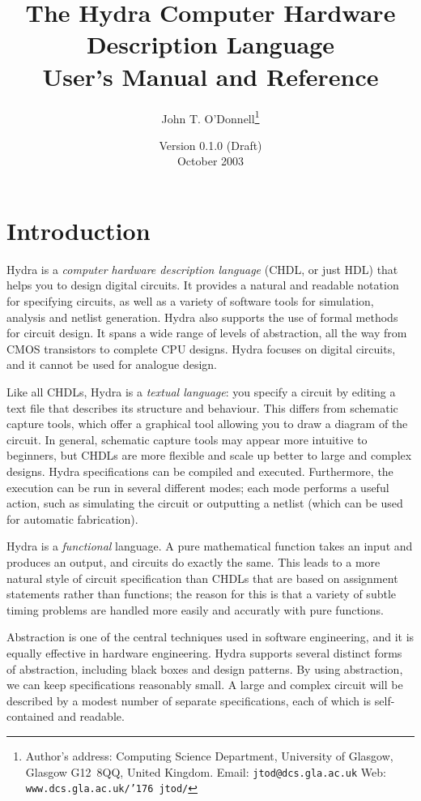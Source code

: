 \documentclass[a4paper,openany,fleqn]{book}
\title{The Hydra Computer Hardware Description Language\\
  User's Manual and Reference}
\author{John T. O'Donnell\footnote{%
  Author's address: Computing Science Department, University of
  Glasgow, Glasgow G12~8QQ, United Kingdom.
  Email: \texttt{jtod@dcs.gla.ac.uk}
  Web: \texttt{www.dcs.gla.ac.uk/\char'176 jtod/}}}
\date{Version 0.1.0 (Draft)\\ October 2003}
\begin{document}
\frontmatter
\maketitle
\tableofcontents
\mainmatter

\chapter{Introduction}
\label{sec:introduction}

Hydra is a \emph{computer hardware description language} (CHDL, or
just HDL) that helps you to design digital circuits.  It provides a
natural and readable notation for specifying circuits, as well as a
variety of software tools for simulation, analysis and netlist
generation.  Hydra also supports the use of formal methods for circuit
design.  It spans a wide range of levels of abstraction, all the way
from CMOS transistors to complete CPU designs.  Hydra focuses on
digital circuits, and it cannot be used for analogue design.

Like all CHDLs, Hydra is a \emph{textual language}: you specify a
circuit by editing a text file that describes its structure and
behaviour.  This differs from schematic capture tools, which offer a
graphical tool allowing you to draw a diagram of the circuit.  In
general, schematic capture tools may appear more intuitive to
beginners, but CHDLs are more flexible and scale up better to large
and complex designs.  Hydra specifications can be compiled and
executed.  Furthermore, the execution can be run in several different
modes; each mode performs a useful action, such as simulating the
circuit or outputting a netlist (which can be used for automatic
fabrication).

Hydra is a \emph{functional} language.  A pure mathematical function
takes an input and produces an output, and circuits do exactly the
same.  This leads to a more natural style of circuit specification
than CHDLs that are based on assignment statements rather than
functions; the reason for this is that a variety of subtle timing
problems are handled more easily and accuratly with pure functions.

Abstraction is one of the central techniques used in software
engineering, and it is equally effective in hardware engineering.
Hydra supports several distinct forms of abstraction, including black
boxes and design patterns.  By using abstraction, we can keep
specifications reasonably small.  A large and complex circuit will be
described by a modest number of separate specifications, each of which
is self-contained and readable.
\end{document}
